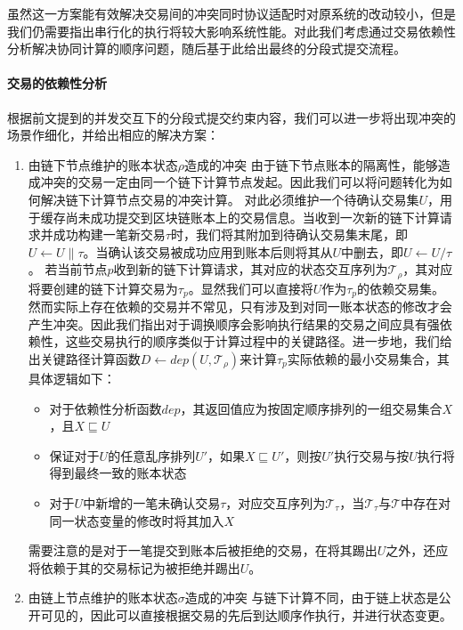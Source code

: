 虽然这一方案能有效解决交易间的冲突同时协议适配时对原系统的改动较小，但是我们仍需要指出串行化的执行将较大影响系统性能。对此我们考虑通过交易依赖性分析解决协同计算的顺序问题，随后基于此给出最终的分段式提交流程。

\paragraph{交易的依赖性分析} 根据前文提到的并发交互下的分段式提交约束内容，我们可以进一步将出现冲突的场景作细化，并给出相应的解决方案：
\begin{enumerate}
    \item 由链下节点维护的账本状态$\rho$造成的冲突
    \subitem 由于链下节点账本的隔离性，能够造成冲突的交易一定由同一个链下计算节点发起。因此我们可以将问题转化为如何解决链下计算节点交易的冲突计算。
    \subitem 对此必须维护一个待确认交易集$U$，用于缓存尚未成功提交到区块链账本上的交易信息。当收到一次新的链下计算请求并成功构建一笔新交易$\tau$时，我们将其附加到待确认交易集末尾，即$U \leftarrow U\parallel\tau$。当确认该交易被成功应用到账本后则将其从$U$中删去，即$U \leftarrow U / \tau$。
    \subitem 若当前节点$p$收到新的链下计算请求，其对应的状态交互序列为$\mathcal{T}_\rho$，其对应将要创建的链下计算交易为$\tau_p$。显然我们可以直接将$U$作为$\tau_p$的依赖交易集。
    \subitem 然而实际上存在依赖的交易并不常见，只有涉及到对同一账本状态的修改才会产生冲突。因此我们指出对于调换顺序会影响执行结果的交易之间应具有强依赖性，这些交易执行的顺序类似于计算过程中的关键路径。进一步地，我们给出关键路径计算函数$D \leftarrow dep(U, \mathcal{T}_\rho)$来计算$\tau_p$实际依赖的最小交易集合，其具体逻辑如下：
    \begin{itemize}
        \setlength{\itemsep}{0pt}
        \setlength{\parsep}{0pt}
        \setlength{\parskip}{0pt}
            \item 对于依赖性分析函数$dep$，其返回值应为按固定顺序排列的一组交易集合$X$，且$X \sqsubseteq U$
            \item 保证对于$U$的任意乱序排列$U'$，如果$X \sqsubseteq U'$，则按$U'$执行交易与按$U$执行将得到最终一致的账本状态
            \item 对于$U$中新增的一笔未确认交易$\tau$，对应交互序列为$\mathcal{T}_\tau$，当$\mathcal{T}_\tau$与$\mathcal{T}$中存在对同一状态变量的修改时将其加入$X$
    \end{itemize}
    \subitem 需要注意的是对于一笔提交到账本后被拒绝的交易，在将其踢出$U$之外，还应将依赖于其的交易标记为被拒绝并踢出$U$。
    \item 由链上节点维护的账本状态$\sigma$造成的冲突
    \subitem 与链下计算不同，由于链上状态是公开可见的，因此可以直接根据交易的先后到达顺序作执行，并进行状态变更。
\end{enumerate}

